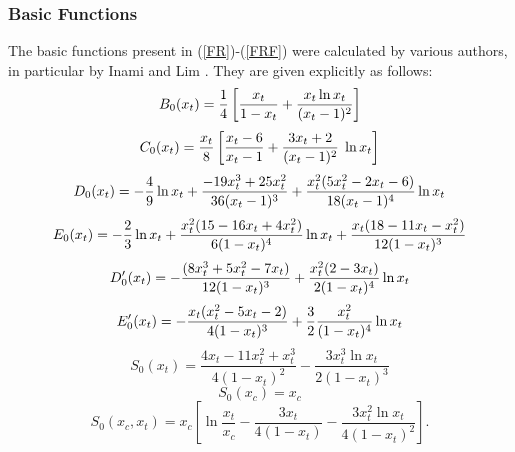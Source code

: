 \documentclass[12pt]{article}
\begin{document}
\begin{itemize}
\subsubsection{Basic Functions}
The basic functions present in (\ref{FR})-(\ref{FRF}) 
were calculated by various authors, in
particular by Inami and Lim \cite{IL}.  
They are given explicitly as follows:
\begin{equation}\label{BF}
B_0(x_t)={1\over
4}\left[{x_t\over{1-x_t}}+{{x_t\ln x_t}\over{(x_t-1)^2}}\right]
\end{equation}
\begin{equation}\label{C0xt}
C_0(x_t)={x_t\over 8}\left[{{x_t-6}\over{x_t-1}}+{{3x_t+2}
\over{(x_t-1)^2}}\;\ln x_t\right] 
\end{equation}
\begin{equation}
D_0(x_t)=-{4\over9}\ln x_t+{{-19x_t^3+25x_t^2}\over{36(x_t-1)^3}}
+{{x_t^2(5x_t^2-2x_t-6)} \over{18(x_t-1)^4}}\ln x_t
\end{equation}
\begin{equation}\label{E0}
E_0(x_t)=-{2\over 3}\ln x_t+{{x_t^2(15-16x_t+4x_t^2)}\over{6(1-x_t)^4}}
\ln x_t+{{x_t(18-11x_t-x_t^2)} \over{12(1-x_t)^3}}
\end{equation}
\begin{equation}
D'_0(x_t)= -{{(8x_t^3 + 5x_t^2 - 7x_t)}\over{12(1-x_t)^3}}+ 
          {{x_t^2(2-3x_t)}\over{2(1-x_t)^4}}\ln x_t
\end{equation}
\begin{equation}
E'_0(x_t)=-{{x_t(x_t^2-5x_t-2)}\over{4(1-x_t)^3}} + {3\over2}
{{x_t^2}\over{(1 - x_t)^4}} \ln x_t
\end{equation}
\begin{equation}\label{S0}
S_0(x_t)=\frac{4x_t-11x^2_t+x^3_t}{4(1-x_t)^2}-
 \frac{3x^3_t \ln x_t}{2(1-x_t)^3}
\end{equation}
\begin{equation}\label{BFF1}
S_0(x_c)=x_c
\end{equation}
\begin{equation}\label{BFF}
S_0(x_c, x_t)=x_c\left[\ln\frac{x_t}{x_c}-\frac{3x_t}{4(1-x_t)}-
 \frac{3 x^2_t\ln x_t}{4(1-x_t)^2}\right].
\end{equation}


\end{itemize}
\end{document}
